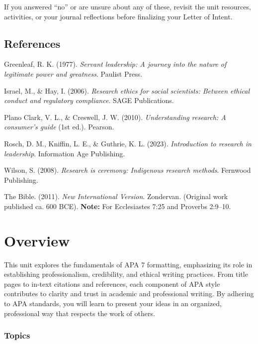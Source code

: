 \documentclass[
  letterpaper,
  DIV=11,
  numbers=noendperiod]{scrreprt}
\begin{document}
If you answered ``no'' or are unsure about any of these, revisit the
unit resources, activities, or your journal reflections before
finalizing your Letter of Intent.

\section*{References}\label{references-5}


Greenleaf, R. K. (1977). \emph{Servant leadership: A journey into the
nature of legitimate power and greatness}. Paulist Press.

Israel, M., \& Hay, I. (2006). \emph{Research ethics for social
scientists: Between ethical conduct and regulatory compliance}. SAGE
Publications.

Plano Clark, V. L., \& Creswell, J. W. (2010). \emph{Understanding
research: A consumer's guide} (1st ed.). Pearson.

Rosch, D. M., Kniffin, L. E., \& Guthrie, K. L. (2023).
\emph{Introduction to research in leadership}. Information Age
Publishing.

Wilson, S. (2008). \emph{Research is ceremony: Indigenous research
methods}. Fernwood Publishing.

The Bible. (2011). \emph{New International Version}. Zondervan.
(Original work published ca. 600 BCE). \textbf{Note:} For Ecclesiastes
7:25 and Proverbs 2:9--10.


\chapter*{Overview}\label{overview-6}


This unit explores the fundamentals of APA 7 formatting, emphasizing its
role in establishing professionalism, credibility, and ethical writing
practices. From title pages to in-text citations and references, each
component of APA style contributes to clarity and trust in academic and
professional writing. By adhering to APA standards, you will learn to
present your ideas in an organized, professional way that respects the
work of others.

\subsection*{Topics}\label{topics-6}
\end{document}
